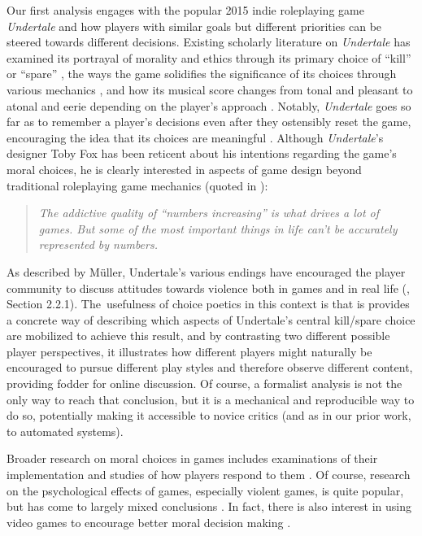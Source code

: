 \documentclass[arts,article,accept,moreauthors,pdftex,10pt,a4paper]{Definitions/mdpi}
\begin{document}
Our first analysis engages with the popular 2015 indie roleplaying game \emph{Undertale} and how players with similar goals but different priorities can be steered towards different decisions.
%
Existing scholarly literature on \emph{Undertale} has examined its portrayal of morality and ethics through its primary choice of ``kill'' or ``spare'' \citep{muller2017undertale}, the ways the game solidifies the significance of its choices through various mechanics \citep{day2017agency}, and how its musical score changes from tonal and pleasant to atonal and eerie depending on the player's approach \citep{perez2017undertale}.
%
Notably, \emph{Undertale} goes so far as to remember a player's decisions even after they ostensibly reset the game, encouraging the idea that its choices are meaningful \citep{hughes2015undertale}.
%
Although \emph{Undertale}'s designer Toby Fox has been reticent about his intentions regarding the game's moral choices, he is clearly interested in aspects of game design beyond traditional roleplaying game mechanics (quoted in \cite{feeld2015interview}):

\begin{quote}
  \itshape
The addictive quality of ``numbers increasing'' is what drives a lot of games. But some of the most important things in life can't be accurately represented by numbers.
\end{quote}


As described by Müller, Undertale's various endings have encouraged the player community to discuss attitudes towards violence both in games and in real life (\cite{muller2017undertale}, Section 2.2.1).
%
The~usefulness of choice poetics in this context is that is provides a concrete way of describing which aspects of Undertale's central kill/spare choice are mobilized to achieve this result, and by contrasting two different possible player perspectives, it illustrates how different players might naturally be encouraged to pursue different play styles and therefore observe different content, providing fodder for online discussion.
%
Of course, a formalist analysis is not the only way to reach that conclusion, but it is a mechanical and reproducible way to do so, potentially making it accessible to novice critics (and as in our prior work, to automated systems).


Broader research on moral choices in games includes examinations of their implementation and studies of how players respond to them \citep{svelch2010good,weaver2012mirrored,consalvo2016playing}.
%
Of course, research on the psychological effects of games, especially violent games, is quite popular, but has come to largely mixed conclusions \citep{ferguson2008school,ellithorpe2015moral}.
%
In fact, there is also interest in using video games to encourage better moral decision making \citep{kastarov2017training}.
\end{document}
